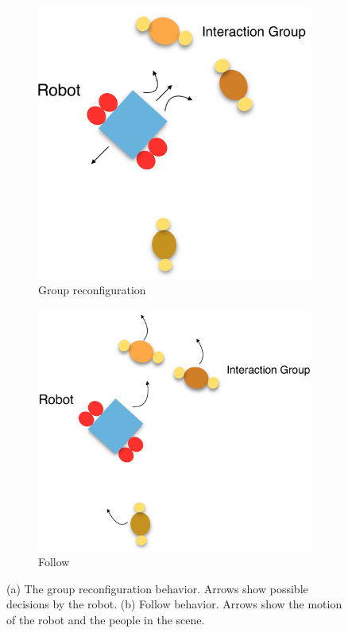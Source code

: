 \documentclass[letterpaper, 10 pt, conference]{ieeeconf}
\begin{document}
	\begin{figure}[tbh]
	\centering
      \begin{subfigure}[b]{0.39\columnwidth}
    \includegraphics[scale = 0.15]{images/static.png}
    \caption{Group reconfiguration}
    \label{fig:static}
  \end{subfigure}
  \hspace{10mm}
  \begin{subfigure}[b]{0.39\columnwidth}
  \hspace{4mm}
    \includegraphics[scale = 0.15]{images/follow.png}
    \caption{Follow}
    \label{fig:follow}
  \end{subfigure} 
  \caption{(a) The group reconfiguration behavior. Arrows show possible decisions by the robot.  (b) Follow behavior. Arrows show the motion of the robot and the people in the scene.}


\end{figure}
\end{document}
